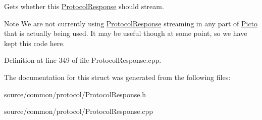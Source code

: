 Gets whether this \hyperlink{struct_picto_1_1_protocol_response}{Protocol\-Response} should stream. 

\begin{DoxyNote}{Note}
We are not currently using \hyperlink{struct_picto_1_1_protocol_response}{Protocol\-Response} streaming in any part of \hyperlink{namespace_picto}{Picto} that is actually being used. It may be useful though at some point, so we have kept this code here. 
\end{DoxyNote}


Definition at line 349 of file Protocol\-Response.\-cpp.



The documentation for this struct was generated from the following files\-:\begin{DoxyCompactItemize}
\item 
source/common/protocol/Protocol\-Response.\-h\item 
source/common/protocol/Protocol\-Response.\-cpp\end{DoxyCompactItemize}
